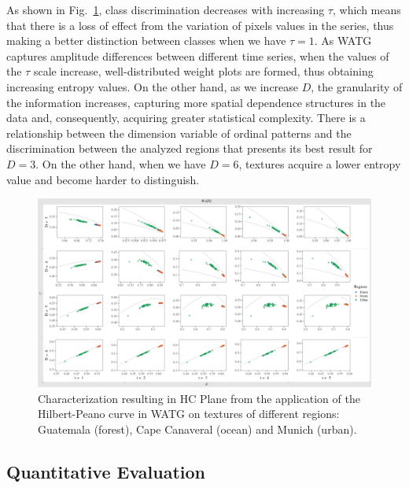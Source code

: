 \documentclass[journal]{IEEEtran}
\begin{document}
As shown in Fig.~\ref{fig:Regions}, class discrimination decreases with increasing $\tau$, which means that there is a loss of effect from the variation of pixels values in the series, thus making a better distinction between classes when we have $\tau = 1$.
As WATG captures amplitude differences between different time series, when the values of the $\tau$ scale increase, well-distributed weight plots are formed, thus obtaining increasing entropy values.
On the other hand, as we increase $D$, the granularity of the information increases, capturing more spatial dependence structures in the data and, consequently, acquiring greater statistical complexity.
There is a relationship between the dimension variable of ordinal patterns and the discrimination between the analyzed regions that presents its best result for $D = 3$.
On the other hand, when we have $D = 6$, textures acquire a lower entropy value and become harder to distinguish.
\begin{figure}
	\centering
	\includegraphics[width=1\textwidth]{Figures/WATGHC.pdf}
	\caption{Characterization resulting in HC Plane from the application of the Hilbert-Peano curve in WATG on textures of different regions: Guatemala (forest), Cape Canaveral (ocean) and Munich (urban).}
	\label{fig:Regions}
\end{figure}

\subsection{Quantitative Evaluation}
\end{document}
